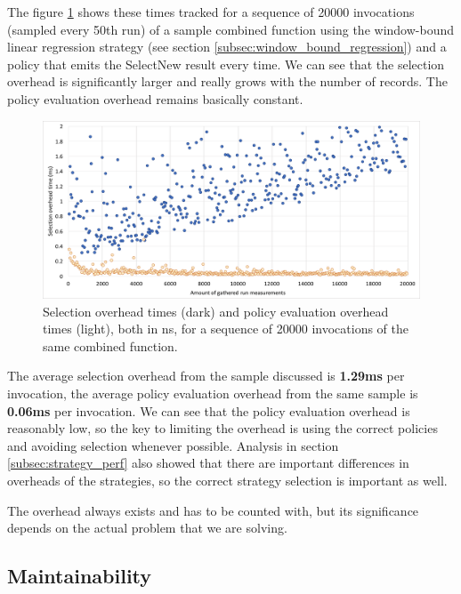 The figure \ref{fig:overhead_sel_policy} shows these times tracked for a sequence of 20000 invocations (sampled every 50th run) of a sample combined function using the window-bound linear regression strategy (see section \ref{subsec:window_bound_regression}) and a policy that emits the SelectNew result every time. We can see that the selection overhead is significantly larger and really grows with the number of records. The policy evaluation overhead remains basically constant.

\begin{figure}[h!]
	\captionsetup{justification=centering,margin=0.5cm}
	\centerline{\mbox{\includegraphics[width=140mm]{./img/overhead_sel_policy.png}}}
	\caption{Selection overhead times (dark) and policy evaluation overhead times (light), both in ns, for a sequence of 20000 invocations of the same combined function.}
	\label{fig:overhead_sel_policy}
\end{figure}

The average selection overhead from the sample discussed is \textbf{1.29ms} per invocation, the average policy evaluation overhead from the same sample is \textbf{0.06ms} per invocation. We can see that the policy evaluation overhead is reasonably low, so the key to limiting the overhead is using the correct policies and avoiding selection whenever possible. Analysis in section \ref{subsec:strategy_perf} also showed that there are important differences in overheads of the strategies, so the correct strategy selection is important as well.

The overhead always exists and has to be counted with, but its significance depends on the actual problem that we are solving. 

\subsection{Maintainability}

